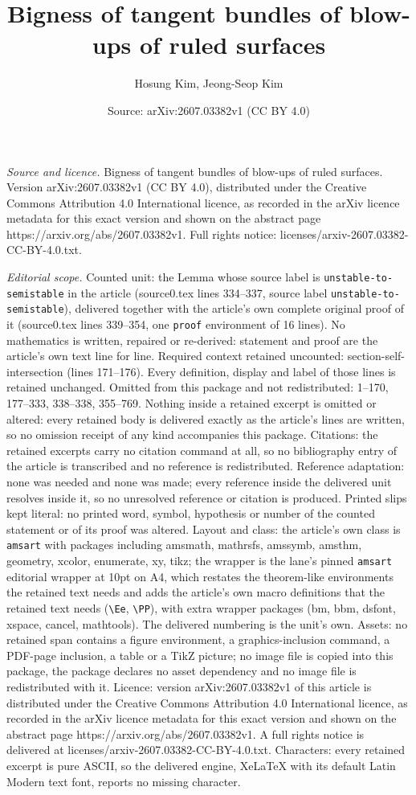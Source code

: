 \documentclass[10pt,a4paper]{amsart}
\title[Bigness of tangent bundles of blow-ups of ruled surfaces]{Bigness of tangent bundles of blow-ups of ruled surfaces}
\author{Hosung Kim, Jeong-Seop Kim}
\date{Source: arXiv:2607.03382v1 (CC BY 4.0)}
\begin{document}
\maketitle

\noindent\emph{Source and licence.} Bigness of tangent bundles of blow-ups of ruled surfaces. Version arXiv:2607.03382v1 (CC BY 4.0), distributed under the Creative Commons Attribution 4.0 International licence, as recorded in the arXiv licence metadata for this exact version and shown on the abstract page https://arxiv.org/abs/2607.03382v1. Full rights notice: licenses/arxiv-2607.03382-CC-BY-4.0.txt.\par\smallskip

\noindent\textit{Editorial scope.} Counted unit: the Lemma whose source label is \texttt{unstable-to-semistable} in the article (source0.tex lines 334--337, source label \texttt{unstable-to-semistable}), delivered together with the article's own complete original proof of it (source0.tex lines 339--354, one \texttt{proof} environment of 16 lines). No mathematics is written, repaired or re-derived: statement and proof are the article's own text line for line. Required context retained uncounted: section-self-intersection (lines 171--176). Every definition, display and label of those lines is retained unchanged. Omitted from this package and not redistributed: 1--170, 177--333, 338--338, 355--769. Nothing inside a retained excerpt is omitted or altered: every retained body is delivered exactly as the article's lines are written, so no omission receipt of any kind accompanies this package. Citations: the retained excerpts carry no citation command at all, so no bibliography entry of the article is transcribed and no reference is redistributed. Reference adaptation: none was needed and none was made; every reference inside the delivered unit resolves inside it, so no unresolved reference or citation is produced. Printed slips kept literal: no printed word, symbol, hypothesis or number of the counted statement or of its proof was altered. Layout and class: the article's own class is \texttt{amsart} with packages including amsmath, mathrsfs, amssymb, amsthm, geometry, xcolor, enumerate, xy, tikz; the wrapper is the lane's pinned \texttt{amsart} editorial wrapper at 10pt on A4, which restates the theorem-like environments the retained text needs and adds the article's own macro definitions that the retained text needs (\texttt{\textbackslash Ee}, \texttt{\textbackslash PP}), with extra wrapper packages (bm, bbm, dsfont, xspace, cancel, mathtools). The delivered numbering is the unit's own. Assets: no retained span contains a figure environment, a graphics-inclusion command, a PDF-page inclusion, a table or a TikZ picture; no image file is copied into this package, the package declares no asset dependency and no image file is redistributed with it. Licence: version arXiv:2607.03382v1 of this article is distributed under the Creative Commons Attribution 4.0 International licence, as recorded in the arXiv licence metadata for this exact version and shown on the abstract page https://arxiv.org/abs/2607.03382v1. A full rights notice is delivered at licenses/arxiv-2607.03382-CC-BY-4.0.txt. Characters: every retained excerpt is pure ASCII, so the delivered engine, XeLaTeX with its default Latin Modern text font, reports no missing character.
\end{document}
